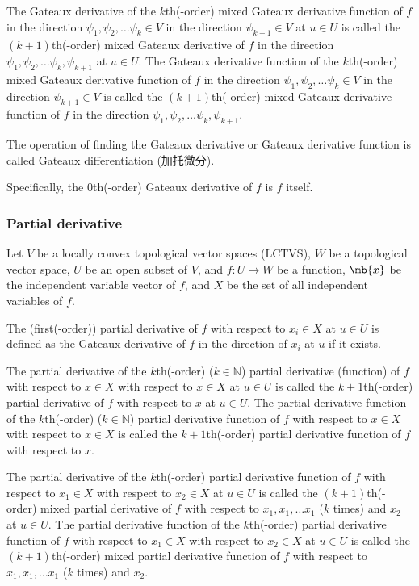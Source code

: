 The Gateaux derivative of the $k$th(-order) mixed Gateaux derivative function of $f$ in the direction $\psi_1,\psi_2,\dots \psi_k\in V$ in the direction $\psi_{k+1}\in V$ at $u\in U$ is called the $(k+1)$th(-order) mixed Gateaux derivative of $f$ in the direction $\psi_1,\psi_2,\dots \psi_k,\psi_{k+1}$ at $u\in U$. The Gateaux derivative function of the $k$th(-order) mixed Gateaux derivative function of $f$ in the direction $\psi_1,\psi_2,\dots \psi_k\in V$ in the direction $\psi_{k+1}\in V$ is called the $(k+1)$th(-order) mixed Gateaux derivative function of $f$ in the direction $\psi_1,\psi_2,\dots \psi_k,\psi_{k+1}$.

The operation of finding the Gateaux derivative or Gateaux derivative function is called Gateaux differentiation (加托微分).

Specifically, the $0$th(-order) Gateaux derivative of $f$ is $f$ itself.
\subsubsection{Partial derivative}
Let $V$ be a locally convex topological vector spaces (LCTVS), $W$ be a topological vector space, $U$ be an open subset of $V$, and $f\colon U\to W$ be a function, $\mb{x}$ be the independent variable vector of $f$, and $X$ be the set of all independent variables of $f$.

The (first(-order)) partial derivative of $f$ with respect to $x_i\in X$ at $u\in U$ is defined as the Gateaux derivative of $f$ in the direction of $x_i$ at $u$ if it exists.

The partial derivative of the $k$th(-order) ($k\in\mathbb{N}$) partial derivative (function) of $f$ with respect to $ x \in X$ with respect to $ x \in X$ at $u\in U$ is called the $k+1$th(-order) partial derivative of $f$ with respect to $ x$ at $u\in U$. The partial derivative function of the $k$th(-order) ($k\in\mathbb{N}$) partial derivative function of $f$ with respect to $ x \in X$ with respect to $ x \in X$ is called the $k+1$th(-order) partial derivative function of $f$ with respect to $ x$.

The partial derivative of the $k$th(-order) partial derivative function of $f$ with respect to $ x_1\in X$ with respect to $ x_2\in X$ at $u\in U$ is called the $(k+1)$th(-order) mixed partial derivative of $f$ with respect to $ x_1, x_1,\dots  x_1$ ($k$ times) and $ x_2$ at $u\in U$. The partial derivative function of the $k$th(-order) partial derivative function of $f$ with respect to $ x_1\in X$ with respect to $ x_2\in X$ at $u\in U$ is called the $(k+1)$th(-order) mixed partial derivative function of $f$ with respect to $ x_1, x_1,\dots  x_1$ ($k$ times) and $ x_2$.

